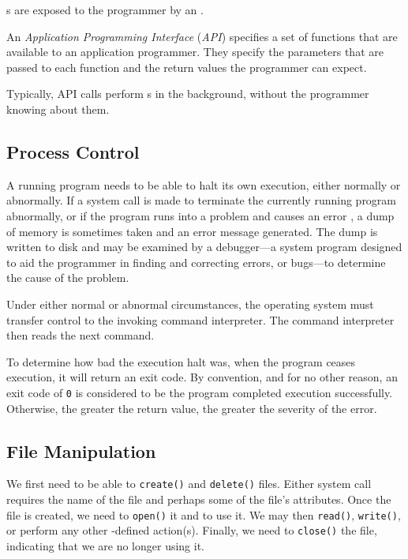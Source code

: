 s are exposed to the programmer by an .
\begin{definition}\label{def:API}
  An \emph{Application Programming Interface} (\emph{API}) specifies a set of functions that are available to an application programmer.
  They specify the parameters that are passed to each function and the return values the programmer can expect.

  Typically, API calls perform s in the background, without the programmer knowing about them.
\end{definition}

\subsection{Process Control}\label{subsec:Process_Control}
A running program needs to be able to halt its own execution, either normally or abnormally.
If a system call is made to terminate the currently running program abnormally, or if the program runs into a problem and causes an error , a dump of memory is sometimes taken and an error message generated.
The dump is written to disk and may be examined by a debugger—a system program designed to aid the programmer in finding and correcting errors, or bugs—to determine the cause of the problem.

Under either normal or abnormal circumstances, the operating system must transfer control to the invoking command interpreter.
The command interpreter then reads the next command.

To determine how bad the execution halt was, when the program ceases execution, it will return an exit code.
By convention, and for no other reason, an exit code of \texttt{0} is considered to be the program completed execution successfully.
Otherwise, the greater the return value, the greater the severity of the error.

\subsection{File Manipulation}\label{subsec:File_Manipulation}
We first need to be able to \texttt{create()} and \texttt{delete()} files.
Either system call requires the name of the file and perhaps some of the file’s attributes.
Once the file is created, we need to \texttt{open()} it and to use it.
We may then \texttt{read()}, \texttt{write()}, or perform any other -defined action(s).
Finally, we need to \texttt{close()} the file, indicating that we are no longer using it.

